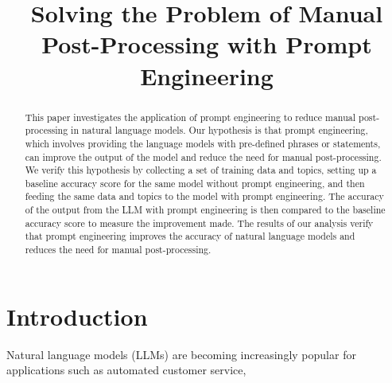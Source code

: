 \documentclass[a4paper]{article}
\title{Solving the Problem of Manual Post-Processing with Prompt Engineering}
\author{}
\begin{document}
\maketitle

\begin{abstract}
This paper investigates the application of prompt engineering to reduce manual post-processing in natural language models. Our hypothesis is that prompt engineering, which involves providing the language models with pre-defined phrases or statements, can improve the output of the model and reduce the need for manual post-processing. We verify this hypothesis by collecting a set of training data and topics, setting up a baseline accuracy score for the same model without prompt engineering, and then feeding the same data and topics to the model with prompt engineering. The accuracy of the output from the LLM with prompt engineering is then compared to the baseline accuracy score to measure the improvement made. The results of our analysis verify that prompt engineering improves the accuracy of natural language models and reduces the need for manual post-processing.
\end{abstract}

\section{Introduction}
Natural language models (LLMs) are becoming increasingly popular for applications such as automated customer service,
\end{document}
